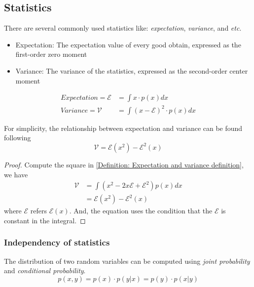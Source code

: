 \documentclass[../main.tex]{subfiles}
\begin{document}
\subsection{Statistics}
There are several commonly used statistics like: \emph{expectation}, \emph{variance}, and \textit{etc}.
\begin{itemize}
    \item Expectation: The expectation value of every good obtain, expressed as the first-order zero moment
    \item Variance: The variance of the statistics, expressed as the second-order center moment
\end{itemize}
\begin{equation}
    \label{Definition: Expectation and variance definition}
    \begin{split}
        Expectation = \mathcal{E} & = \int x \cdot p(x) dx                 \\
        Variance = \mathcal{V}    & = \int (x-\mathcal{E})^2 \cdot p(x) dx
    \end{split}
\end{equation}
\begin{lemma}
    \label{Lemma: Relationship between expectation and variance}
    For simplicity, the relationship between expectation and variance can be found following
    \begin{equation*}
        \mathcal{V} = \mathcal{E}(x^2) - \mathcal{E}^2(x)
    \end{equation*}
    \begin{proof}
        Compute the square in \eqref{Definition: Expectation and variance definition},
        we have
        \begin{align*}
            \mathcal{V} & = \int (x^2 - 2 x \mathcal{E} + \mathcal{E}^2) p(x) dx \\
                        & = \mathcal{E}(x^2) - \mathcal{E}^2(x)
        \end{align*}
        where $\mathcal{E}$ refers $\mathcal{E}(x)$.
        And, the equation uses the condition that the $\mathcal{E}$ is constant in the integral.
    \end{proof}
\end{lemma}

\subsubsection{Independency of statistics}
The distribution of two random variables can be computed using \emph{joint probability} and \emph{conditional probability}.
\begin{equation*}
    p(x, y) = p(x) \cdot p(y|x) = p(y) \cdot p(x|y)
\end{equation*}
\end{document}
